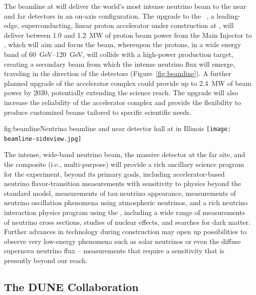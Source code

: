 The  %
beamline at  will deliver the world's most intense neutrino beam to the near and far detectors in an on-axis configuration. 
The upgrade to the  ~\cite{pip2-2013}, a leading-edge, superconducting, linear proton accelerator under construction at , will deliver between \num{1.0} and \SI{1.2}{MW} of proton beam power from the  Main Injector to , which will aim and focus the beam, whereupon the protons,  in a wide energy band of \SIrange{60}{120}{\GeV}, will collide with a high-power production target, creating a secondary beam from which the intense neutrino flux will emerge, traveling in the direction of the  detectors (Figure~\ref{fig:beamline}).   A further planned upgrade 
of the accelerator complex could provide up to \SI{2.4}{\MW} of beam power by 2030, 
potentially extending the  science reach. The upgrade will also increase the reliability of the  accelerator complex and provide the flexibility to produce customized  beams tailored to specific scientific needs.

\begin{dunefigure}{fig:beamline}{Neutrino beamline and  near detector hall at  in Illinois}
\texttt{[image: beamline-sideview.jpg]}
\end{dunefigure}

The intense, wide-band neutrino beam, the massive  detector at the far site, and the composite (i.e., multi-purpose) 
 will provide a rich ancillary science program for the  experiment, beyond its primary goals,   
including accelerator-based neutrino flavor-transition measurements with sensitivity to physics beyond the standard model, measurements of tau neutrino appearance, measurements of neutrino oscillation phenomena using atmospheric neutrinos, and  a rich neutrino interaction physics program using the  , including a wide range of measurements of neutrino cross sections, studies of nuclear effects, and searches for dark matter. 
Further advances in  
technology during   construction may open up possibilities to observe very low-energy phenomena such as solar neutrinos or even the diffuse supernova neutrino flux -- measurements that require a sensitivity that is presently beyond our reach.

\subsection{The DUNE Collaboration}

